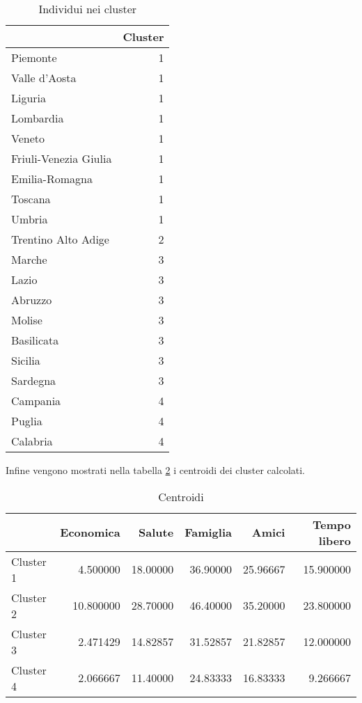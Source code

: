 \documentclass[]{book}
\begin{document}
\begin{table}

\caption{\label{tab:kmeans-cluster}Individui nei cluster}
\centering
\begin{tabular}[t]{l|r}
\hline
  & Cluster\\
\hline
Piemonte & 1\\
\hline
Valle d'Aosta & 1\\
\hline
Liguria & 1\\
\hline
Lombardia & 1\\
\hline
Veneto & 1\\
\hline
Friuli-Venezia Giulia & 1\\
\hline
Emilia-Romagna & 1\\
\hline
Toscana & 1\\
\hline
Umbria & 1\\
\hline
Trentino Alto Adige & 2\\
\hline
Marche & 3\\
\hline
Lazio & 3\\
\hline
Abruzzo & 3\\
\hline
Molise & 3\\
\hline
Basilicata & 3\\
\hline
Sicilia & 3\\
\hline
Sardegna & 3\\
\hline
Campania & 4\\
\hline
Puglia & 4\\
\hline
Calabria & 4\\
\hline
\end{tabular}
\end{table}

Infine vengono mostrati nella tabella \ref{tab:kmeans-centri} i
centroidi dei cluster calcolati.

\begin{table}

\caption{\label{tab:kmeans-centri}Centroidi}
\centering
\begin{tabular}[t]{l|r|r|r|r|r}
\hline
  & Economica & Salute & Famiglia & Amici & Tempo libero\\
\hline
Cluster 1 & 4.500000 & 18.00000 & 36.90000 & 25.96667 & 15.900000\\
\hline
Cluster 2 & 10.800000 & 28.70000 & 46.40000 & 35.20000 & 23.800000\\
\hline
Cluster 3 & 2.471429 & 14.82857 & 31.52857 & 21.82857 & 12.000000\\
\hline
Cluster 4 & 2.066667 & 11.40000 & 24.83333 & 16.83333 & 9.266667\\
\hline
\end{tabular}
\end{table}
\end{document}

